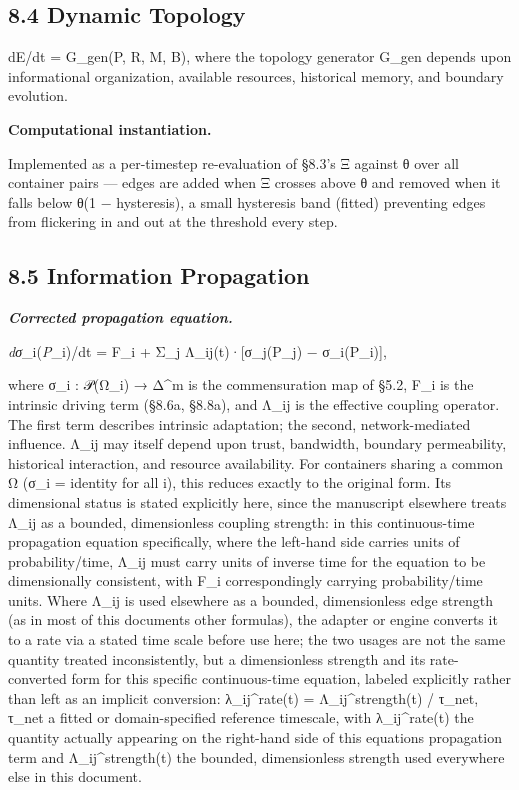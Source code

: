 \documentclass[
]{article}
\begin{document}
\hypertarget{dynamic-topology}{%
\subsection{8.4 Dynamic Topology}\label{dynamic-topology}}

dE/dt = G\_gen(P, R, M, B), where the topology generator G\_gen depends
upon informational organization, available resources, historical memory,
and boundary evolution.

\textbf{Computational instantiation.}

Implemented as a per-timestep re-evaluation of §8.3's Ξ against θ over
all container pairs --- edges are added when Ξ crosses above θ and
removed when it falls below θ(1 − hysteresis), a small hysteresis band
(fitted) preventing edges from flickering in and out at the threshold
every step.

\hypertarget{information-propagation}{%
\subsection{8.5 Information Propagation}\label{information-propagation}}

\emph{\textbf{Corrected propagation equation.}}

\emph{dσ}\_i(\emph{P}\_i)/dt = F\_i + Σ\_j Λ\_ij(t)·{[}σ\_j(P\_j) −
σ\_i(P\_i){]},

where σ\_i : 𝒫(Ω\_i) → Δ\^{}m is the commensuration map of §5.2, F\_i is
the intrinsic driving term (§8.6a, §8.8a), and Λ\_ij is the effective
coupling operator. The first term describes intrinsic adaptation; the
second, network-mediated influence. Λ\_ij may itself depend upon trust,
bandwidth, boundary permeability, historical interaction, and resource
availability. For containers sharing a common Ω (σ\_i = identity for all
i), this reduces exactly to the original form. Its dimensional status is
stated explicitly here, since the manuscript elsewhere treats Λ\_ij as a
bounded, dimensionless coupling strength: in this continuous-time
propagation equation specifically, where the left-hand side carries
units of probability/time, Λ\_ij must carry units of inverse time for
the equation to be dimensionally consistent, with F\_i correspondingly
carrying probability/time units. Where Λ\_ij is used elsewhere as a
bounded, dimensionless edge strength (as in most of this documents other
formulas), the adapter or engine converts it to a rate via a stated time
scale before use here; the two usages are not the same quantity treated
inconsistently, but a dimensionless strength and its rate-converted form
for this specific continuous-time equation, labeled explicitly rather
than left as an implicit conversion: λ\_ij\^{}rate(t) =
Λ\_ij\^{}strength(t) / τ\_net, τ\_net a fitted or domain-specified
reference timescale, with λ\_ij\^{}rate(t) the quantity actually
appearing on the right-hand side of this equations propagation term and
Λ\_ij\^{}strength(t) the bounded, dimensionless strength used everywhere
else in this document.
\end{document}
